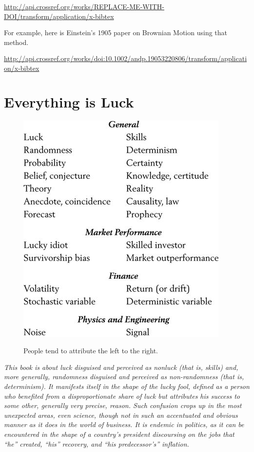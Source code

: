 \documentclass[hidelinks, 11pt, twocolumn]{article}
\begin{document}
\url{http://api.crossref.org/works/REPLACE-ME-WITH-DOI/transform/application/x-bibtex}


For example, here is Einstein's 1905 paper on Brownian Motion using that method.

\url{http://api.crossref.org/works/doi:10.1002/andp.19053220806/transform/application/x-bibtex}



\section{Everything is Luck}

\begin{figure}[h]
	\centering
	\includegraphics[scale=1]{images/luck-skill.jpg}\\
	\caption{People tend to attribute the left to the right. \cite{taleb2005fooled}}
	\label{fig:how_pop3_works}
\end{figure}

\textit{This book is about luck disguised and perceived as nonluck (that is, skills) and, more generally, randomness disguised and perceived as non-randomness (that is, determinism).
	It manifests itself in the shape of the lucky fool, defined as a person who benefited from a disproportionate share of luck but attributes his success to some other, generally very precise, reason.
	Such confusion crops up in the most unexpected areas, even science, though not in such an accentuated and obvious manner as it does in the world of business.
	It is endemic in politics, as it can be encountered in the shape of a country’s president discoursing on the jobs that “he” created, “his” recovery, and “his predecessor’s” inflation.\cite{taleb2005fooled}}
\end{document}
